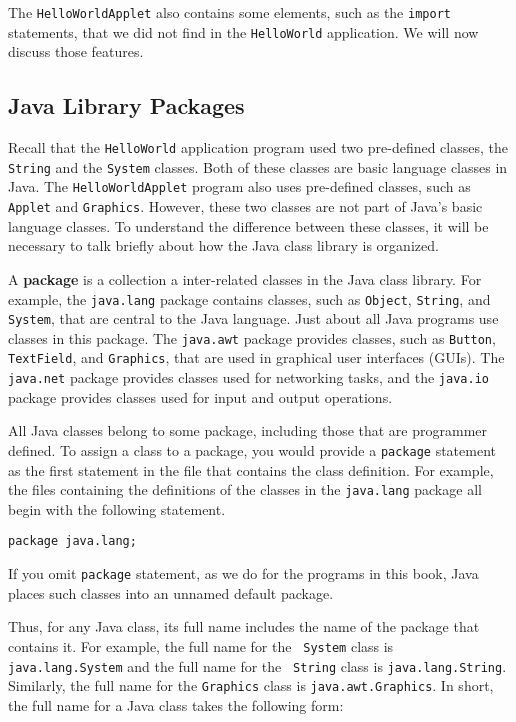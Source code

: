 The {\tt HelloWorldApplet} also contains some elements, such as the
{\tt import} statements, that we did not find in the {\tt HelloWorld}
application. We will now discuss those features.


\subsection{Java Library Packages} 

Recall that the {\tt HelloWorld} application program used two
pre-defined classes, the {\tt String} and the {\tt System}
classes. Both of these classes are basic language classes in Java.
The {\tt HelloWorldApplet} program also uses pre-defined classes, such
as {\tt Applet} and {\tt Graphics}. However, these two classes are not
part of Java's basic language classes.  To understand the difference
between these classes, it will be necessary to talk briefly about
how the Java class library is organized.

A {\bf package} is a collection a inter-related classes in the Java
class library. For example, the {\tt java.lang} package contains
classes, such as {\tt Object}, {\tt String}, and {\tt System}, that
are central to the Java language. Just about all Java programs use
classes in this package. The {\tt java.awt} package provides classes,
such as {\tt Button}, {\tt TextField}, and {\tt Graphics}, that are
used in graphical user interfaces (GUIs).  The {\tt java.net} package
provides classes used for networking tasks, and the {\tt java.io}
package provides classes used for input and output operations.

All Java classes belong to some package, including those that are
programmer defined. To assign a class to a package, you would provide
a {\tt package} statement as the first statement in the file that
contains the class definition. For example, the files containing the
definitions of the classes in the {\tt java.lang} package all begin
with the following statement.

\begin{jjjlisting}
\begin{lstlisting}
package java.lang;
\end{lstlisting}
\end{jjjlisting}

\noindent If you omit {\tt package} statement, as we do for the
programs in this book, Java places such classes into an unnamed
default package. 

Thus, for any Java class, its full name includes the name of the
package that contains it. For example, the full name for the {\tt
System} class is {\tt java.lang.System} and the full name for the {\tt
String} class is {\tt java.lang.String}.  Similarly, the full name for
the {\tt Graphics} class is {\tt java.awt.Graphics}.  In short, the
full name for a Java class takes the following form:

